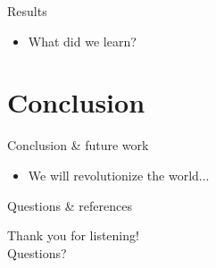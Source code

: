\documentclass[compress]{beamer}
\begin{document}
	\begin{frame}{Results}
	\begin{itemize}
		\item What did we learn?
	\end{itemize}
	\end{frame}

\section{Conclusion}
	
	\begin{frame}{Conclusion \& future work}
	\begin{itemize}
		\item We will revolutionize the world...
	\end{itemize}
	\end{frame}

	\begin{frame}{Questions \& references}
	\begin{center}
		\LARGE
		Thank you for listening!\\ \vspace{10pt}Questions?
	\end{center}
		\fontsize{7pt}{8.4}\selectfont
		
		
	\end{frame}
\end{document}
